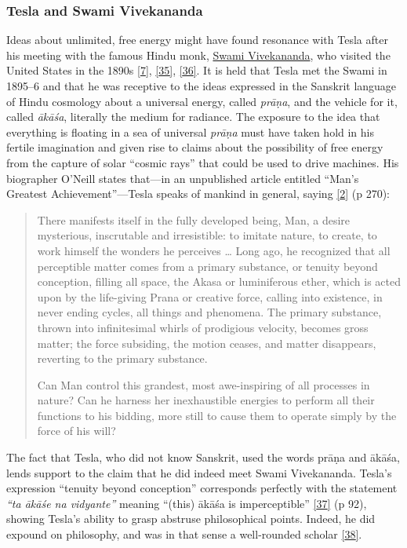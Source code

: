 \documentclass[
  a4paper,
]{article}
\begin{document}
\hypertarget{tesla-and-swami-vivekananda}{%
\subsubsection{Tesla and Swami
Vivekananda}\label{tesla-and-swami-vivekananda}}

Ideas about unlimited, free energy might have found resonance with Tesla
after his meeting with the famous Hindu monk,
\href{https://en.wikipedia.org/wiki/Swami_Vivekananda}{Swami
Vivekananda}, who visited the United States in the 1890s
\protect\hyperlink{ref-tesla-home}{{[}7{]}},
\protect\hyperlink{ref-grotz}{{[}35{]}},
\protect\hyperlink{ref-dobson}{{[}36{]}}. It is held that Tesla met the
Swami in 1895--6 and that he was receptive to the ideas expressed in the
Sanskrit language of Hindu cosmology about a universal energy, called
\emph{prāṇa}, and the vehicle for it, called \emph{ākāśa}, literally the
medium for radiance. The exposure to the idea that everything is
floating in a sea of universal \emph{prāṇa} must have taken hold in his
fertile imagination and given rise to claims about the possibility of
free energy from the capture of solar ``cosmic rays'' that could be used
to drive machines. His biographer O'Neill states that---in an
unpublished article entitled ``Man's Greatest Achievement''---Tesla
speaks of mankind in general, saying
\protect\hyperlink{ref-oneill80}{{[}2{]}} (p 270):

\begin{quote}
There manifests itself in the fully developed being, Man, a desire
mysterious, inscrutable and irresistible: to imitate nature, to create,
to work himself the wonders he perceives \ldots{} Long ago, he
recognized that all perceptible matter comes from a primary substance,
or tenuity beyond conception, filling all space, the Akasa or
luminiferous ether, which is acted upon by the life-giving Prana or
creative force, calling into existence, in never ending cycles, all
things and phenomena. The primary substance, thrown into infinitesimal
whirls of prodigious velocity, becomes gross matter; the force
subsiding, the motion ceases, and matter disappears, reverting to the
primary substance.

Can Man control this grandest, most awe-inspiring of all processes in
nature? Can he harness her inexhaustible energies to perform all their
functions to his bidding, more still to cause them to operate simply by
the force of his will?
\end{quote}

The fact that Tesla, who did not know Sanskrit, used the words prāṇa and
ākāśa, lends support to the claim that he did indeed meet Swami
Vivekananda. Tesla's expression ``tenuity beyond conception''
corresponds perfectly with the statement \emph{``ta ākāśe na vidyante''}
meaning ``(this) ākāśa is imperceptible''
\protect\hyperlink{ref-agra01}{{[}37{]}} (p 92), showing Tesla's ability
to grasp abstruse philosophical points. Indeed, he did expound on
philosophy, and was in that sense a well-rounded scholar
\protect\hyperlink{ref-tesla-cosmic}{{[}38{]}}.
\end{document}
